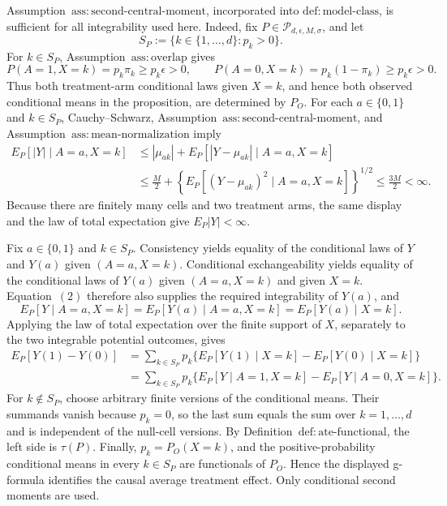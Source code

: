 Assumption~\(\mathrm{ass:second\text{-}central\text{-}moment}\), incorporated into \(\mathrm{def:model\text{-}class}\), is sufficient for all integrability used here.  Indeed, fix \(P\in\mathcal P_{d,\epsilon,M,\sigma}\), and let
\[
 S_P:=\{k\in\{1,\ldots,d\}:p_k>0\}.
\]
For \(k\in S_P\), Assumption~\(\mathrm{ass:overlap}\) gives
\[
 P(A=1,X=k)=p_k\pi_k\ge p_k\epsilon>0,
 \qquad
 P(A=0,X=k)=p_k(1-\pi_k)\ge p_k\epsilon>0.
\tag{1}
\]
Thus both treatment-arm conditional laws given \(X=k\), and hence both observed conditional means in the proposition, are determined by \(P_O\).  For each \(a\in\{0,1\}\) and \(k\in S_P\), Cauchy--Schwarz, Assumption~\(\mathrm{ass:second\text{-}central\text{-}moment}\), and Assumption~\(\mathrm{ass:mean\text{-}normalization}\) imply
\[
\begin{aligned}
 E_P[|Y|\mid A=a,X=k]
 &\le |\mu_{ak}|+E_P[|Y-\mu_{ak}|\mid A=a,X=k]\\
 &\le \frac M2+
 \left\{E_P[(Y-\mu_{ak})^2\mid A=a,X=k]\right\}^{1/2}
 \le \frac{3M}{2}<\infty.
\end{aligned}
\tag{2}
\]
Because there are finitely many cells and two treatment arms, the same display and the law of total expectation give \(E_P|Y|<\infty\).

Fix \(a\in\{0,1\}\) and \(k\in S_P\).  Consistency yields equality of the conditional laws of \(Y\) and \(Y(a)\) given \((A=a,X=k)\).  Conditional exchangeability yields equality of the conditional laws of \(Y(a)\) given \((A=a,X=k)\) and given \(X=k\).  Equation~\((2)\) therefore also supplies the required integrability of \(Y(a)\), and
\[
 E_P[Y\mid A=a,X=k]
 =E_P[Y(a)\mid A=a,X=k]
 =E_P[Y(a)\mid X=k].
\tag{3}
\]
Applying the law of total expectation over the finite support of \(X\), separately to the two integrable potential outcomes, gives
\[
\begin{aligned}
 E_P[Y(1)-Y(0)]
 &=\sum_{k\in S_P}p_k
 \{E_P[Y(1)\mid X=k]-E_P[Y(0)\mid X=k]\}\\
 &=\sum_{k\in S_P}p_k
 \{E_P[Y\mid A=1,X=k]-E_P[Y\mid A=0,X=k]\}.
\end{aligned}
\tag{4}
\]
For \(k\notin S_P\), choose arbitrary finite versions of the conditional means.  Their summands vanish because \(p_k=0\), so the last sum equals the sum over \(k=1,\ldots,d\) and is independent of the null-cell versions.  By Definition~\(\mathrm{def:ate\text{-}functional}\), the left side is \(\tau(P)\).  Finally, \(p_k=P_O(X=k)\), and the positive-probability conditional means in every \(k\in S_P\) are functionals of \(P_O\).  Hence the displayed g-formula identifies the causal average treatment effect.  Only conditional second moments are used.